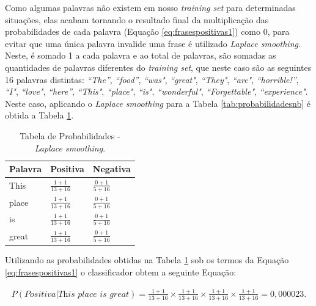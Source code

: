 Como algumas palavras não existem em nosso \textit{training set} para
determinadas situações, elas acabam tornando o resultado final da multiplicação
das probabilidades de cada palavra (Equação \ref{eq:frasespositivas1}) como 0,
para evitar que uma única palavra invalide uma frase é utilizado \textit{Laplace smoothing}. Neste, é somado
1 a cada palavra e ao total de palavras, são somadas as quantidades de palavras diferentes do \textit{training set}, que neste caso são
as seguintes 16 palavras distintas: \textit{``The''}, \textit{``food''},
\textit{``was"}, \textit{``great"}, \textit{``They"}, \textit{``are"},
\textit{``horrible!''}, \textit{``I"}, \textit{``love"}, \textit{``here''},
\textit{``This"}, \textit{``place"}, \textit{``is"}, \textit{``wonderful"},
\textit{``Forgettable"}, \textit{``experience"}. Neste caso, aplicando o
\textit{Laplace smoothing} para a Tabela \ref{tab:probabilidadesnb} é obtida a
Tabela \ref{tab:probabilidadesl}.

\newpage

\begin{table}[htb]
\centering
\renewcommand{\arraystretch}{1.5}%
\begin{tabular}{lll}
\hline

Palavra & Positiva & Negativa \\ \hline
This & \large $\frac{1 + 1}{13 + 16}$ & \large $\frac{0 + 1}{5 + 16}$ \\
place & \large $\frac{1 + 1}{13 + 16}$ & \large $\frac{0 + 1}{5 + 16}$ \\
is & \large $\frac{1 + 1}{13 + 16}$ & \large $\frac{0 + 1}{5 + 16}$ \\
great & \large $\frac{1 + 1}{13 + 16}$ & \large $\frac{0 + 1}{5 + 16}$ \\
\end{tabular}
\caption{Tabela de Probabilidades - \textit{Laplace smoothing}.}
\label{tab:probabilidadesl}
\end{table}

Utilizando as probabilidades obtidas na Tabela
\ref{tab:probabilidadesl} sob os termos da Equação \ref{eq:frasespositivas1} o
classificador obtem a seguinte Equação:

\begin{equation}
\begin{gathered}
P(Positiva|\textit{This place is great}) = \frac{1 + 1}{13 + 16} \times
\frac{1 + 1}{13 + 16} \times \frac{1 + 1}{13 + 16} \times
\frac{1 + 1}{13 + 16} = 0,000023.
\label{eq:ppositivaplace}
\end{gathered}
\end{equation}


